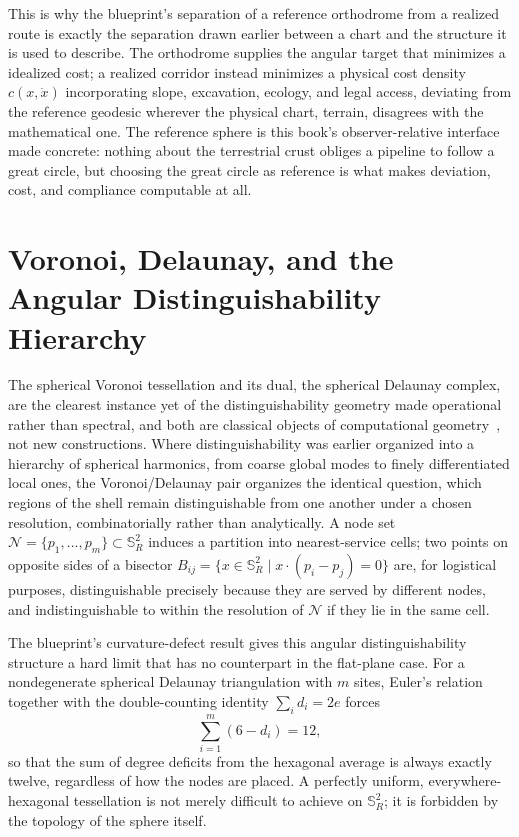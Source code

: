 \documentclass[11pt,fleqn]{book}
\numberwithin{equation}{chapter}
\theoremstyle{plain}
\theoremstyle{definition}
\theoremstyle{remark}
\newcommand{\Sphere}{\mathbb{S}^{2}}
\newcommand{\Nset}{\mathcal{N}}
\begin{document}
This is why the blueprint's separation of a reference orthodrome from a realized route is exactly the separation drawn earlier between a chart and the structure it is used to describe. The orthodrome supplies the angular target that minimizes a idealized cost; a realized corridor instead minimizes a physical cost density \(c(x,\dot x)\) incorporating slope, excavation, ecology, and legal access, deviating from the reference geodesic wherever the physical chart, terrain, disagrees with the mathematical one. The reference sphere is this book's observer-relative interface made concrete: nothing about the terrestrial crust obliges a pipeline to follow a great circle, but choosing the great circle as reference is what makes deviation, cost, and compliance computable at all.

\section{Voronoi, Delaunay, and the Angular Distinguishability Hierarchy}

The spherical Voronoi tessellation and its dual, the spherical Delaunay complex, are the clearest instance yet of the distinguishability geometry made operational rather than spectral, and both are classical objects of computational geometry~\cite{okabe2000}, not new constructions. Where distinguishability was earlier organized into a hierarchy of spherical harmonics, from coarse global modes to finely differentiated local ones, the Voronoi/Delaunay pair organizes the identical question, which regions of the shell remain distinguishable from one another under a chosen resolution, combinatorially rather than analytically. A node set \(\Nset=\{p_1,\dots,p_m\}\subset\Sphere_R\) induces a partition into nearest-service cells; two points on opposite sides of a bisector \(B_{ij}=\{x\in\Sphere_R\mid x\cdot(p_i-p_j)=0\}\) are, for logistical purposes, distinguishable precisely because they are served by different nodes, and indistinguishable to within the resolution of \(\Nset\) if they lie in the same cell.

The blueprint's curvature-defect result gives this angular distinguishability structure a hard limit that has no counterpart in the flat-plane case. For a nondegenerate spherical Delaunay triangulation with \(m\) sites, Euler's relation together with the double-counting identity \(\sum_i d_i = 2e\) forces
\begin{equation}
\sum_{i=1}^m (6-d_i) = 12,
\end{equation}
so that the sum of degree deficits from the hexagonal average is always exactly twelve, regardless of how the nodes are placed. A perfectly uniform, everywhere-hexagonal tessellation is not merely difficult to achieve on \(\Sphere_R\); it is forbidden by the topology of the sphere itself.
\end{document}
